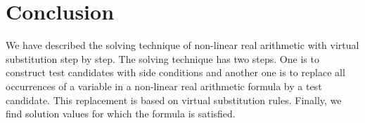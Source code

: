 \section{Conclusion}
\label{sec:conclusion}
We have described the solving technique of non-linear real arithmetic with virtual substitution step by step. The solving technique has two steps. One is to construct test candidates with side conditions and another one is to replace all occurrences of a variable in a non-linear real arithmetic formula by a test candidate. This replacement is based on virtual substitution rules. Finally, we find solution values for which the formula is satisfied.
